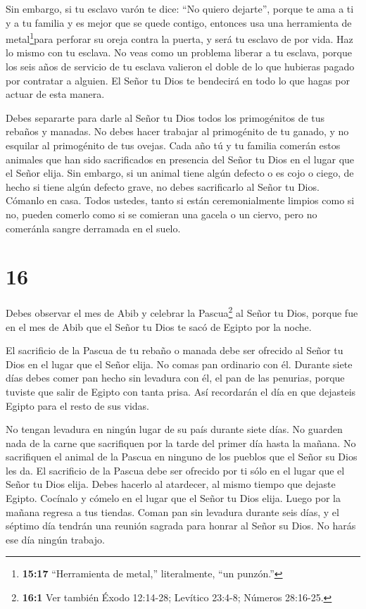  Sin embargo, si tu esclavo varón te dice: ``No quiero
dejarte'', porque te ama a ti y a tu familia y es mejor que se quede
contigo,  entonces usa una herramienta de
metal\footnote{\textbf{15:17} ``Herramienta de metal,'' literalmente,
  ``un punzón.''}para perforar su oreja contra la puerta, y será tu
esclavo de por vida. Haz lo mismo con tu esclava.  No veas
como un problema liberar a tu esclava, porque los seis años de servicio
de tu esclava valieron el doble de lo que hubieras pagado por contratar
a alguien. El Señor tu Dios te bendecirá en todo lo que hagas por actuar
de esta manera.

 Debes separarte para darle al Señor tu Dios todos los
primogénitos de tus rebaños y manadas. No debes hacer trabajar al
primogénito de tu ganado, y no esquilar al primogénito de tus ovejas.
 Cada año tú y tu familia comerán estos animales que han
sido sacrificados en presencia del Señor tu Dios en el lugar que el
Señor elija.  Sin embargo, si un animal tiene algún defecto
o es cojo o ciego, de hecho si tiene algún defecto grave, no debes
sacrificarlo al Señor tu Dios.  Cómanlo en casa. Todos
ustedes, tanto si están ceremonialmente limpios como si no, pueden
comerlo como si se comieran una gacela o un ciervo,  pero
no comeránla sangre derramada en el suelo.

\hypertarget{section-15}{%
\section{16}\label{section-15}}

 Debes observar el mes de Abib y celebrar la
Pascua\footnote{\textbf{16:1} Ver también Éxodo 12:14-28; Levítico
  23:4-8; Números 28:16-25.} al Señor tu Dios, porque fue en el mes de
Abib que el Señor tu Dios te sacó de Egipto por la noche.

 El sacrificio de la Pascua de tu rebaño o manada debe ser
ofrecido al Señor tu Dios en el lugar que el Señor elija. 
No comas pan ordinario con él. Durante siete días debes comer pan hecho
sin levadura con él, el pan de las penurias, porque tuviste que salir de
Egipto con tanta prisa. Así recordarán el día en que dejasteis Egipto
para el resto de sus vidas.

 No tengan levadura en ningún lugar de su país durante siete
días. No guarden nada de la carne que sacrifiquen por la tarde del
primer día hasta la mañana.  No sacrifiquen el animal de la
Pascua en ninguno de los pueblos que el Señor su Dios les da.
 El sacrificio de la Pascua debe ser ofrecido por ti sólo en
el lugar que el Señor tu Dios elija. Debes hacerlo al atardecer, al
mismo tiempo que dejaste Egipto.  Cocínalo y cómelo en el
lugar que el Señor tu Dios elija. Luego por la mañana regresa a tus
tiendas.  Coman pan sin levadura durante seis días, y el
séptimo día tendrán una reunión sagrada para honrar al Señor su Dios. No
harás ese día ningún trabajo.


